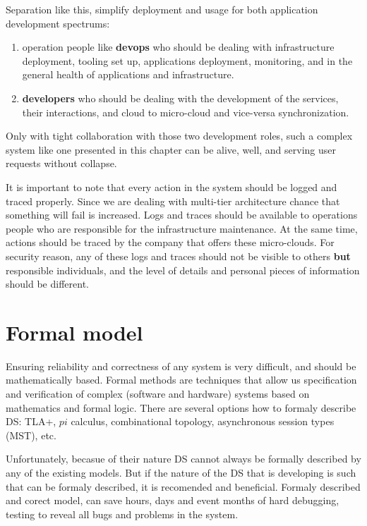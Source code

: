Separation like this, simplify deployment and usage for both application development spectrums: 

\begin{enumerate}[start=1,label={(\bfseries \roman*)}]
	\item operation people like \textbf{devops} who should be dealing with infrastructure deployment, tooling set up, applications deployment, monitoring, and in the general health of applications and infrastructure.
	\item \textbf{developers} who should be dealing with the development of the services, their interactions, and cloud to micro-cloud and vice-versa synchronization.
\end{enumerate}

\noindent
Only with tight collaboration with those two development roles, such a complex system like one presented in this chapter can be alive, well, and serving user requests without collapse.

It is important to note that every action in the system should be logged and traced properly. Since we are dealing with multi-tier architecture chance that something will fail is increased. Logs and traces should be available to operations people who are responsible for the infrastructure maintenance. At the same time, actions should be traced by the company that offers these micro-clouds. For security reason, any of these logs and traces should not be visible to others \textbf{but} responsible individuals, and the level of details and personal pieces of information should be different.
%
%
\section{Formal model}\label{sec:formal_model}
%
Ensuring reliability and correctness of any system is very difficult, and should be mathematically based. Formal methods are techniques that allow us specification and verification of complex (software and hardware) systems based on mathematics and formal logic. There are several options how to formaly describe DS: TLA+, $pi$ calculus, combinational topology, asynchronous session types (MST), etc. 

Unfortunately, becasue of their nature DS cannot always be formally described by any of the existing models. But if the nature of the DS that is developing is such that can be formaly described, it is recomended and beneficial. Formaly described and corect model, can save hours, days and event months of hard debugging, testing to reveal all bugs and problems in the system.

